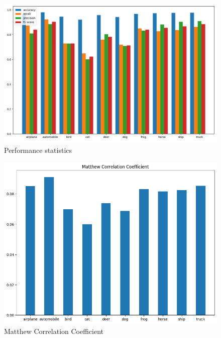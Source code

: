 \documentclass[journal,onecolumn, 12pt]{IEEEtran}
\begin{document}
\begin{figure}[!t]
\includegraphics[width=0.6\paperwidth]{images/stat}
\caption{Performance statistics}
\end{figure}

\begin{figure}[!t]
\includegraphics[width=0.4\paperwidth]{images/mcc}
\caption{Matthew Correlation Coefficient}
\end{figure}
\end{document}
